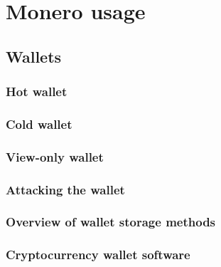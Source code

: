 \documentclass[
  printed, %
  table,   %
  nolof,     %
  nolot,     %
           oneside, color
]{fithesis3}
\begin{document}
\chapter{Monero usage}

\section{Wallets}

\subsection{Hot wallet}

\subsection{Cold wallet}

\subsection{View-only wallet}

\subsection{Attacking the wallet}

\subsection{Overview of wallet storage methods}

\subsection{Cryptocurrency wallet software}
\end{document}
